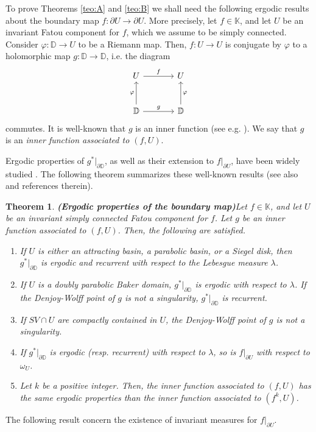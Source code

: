 \documentclass[11pt]{article}
\newtheorem{thm}{Theorem}[section]
\theoremstyle{definition}
\theoremstyle{remark}
\newcounter{main}
\theoremstyle{plain}
\begin{document}
To prove Theorems \ref{teo:A} and \ref{teo:B} we shall need the following ergodic results about the boundary map $ f\colon \partial U\to \partial U $. More precisely, let $ f\in\mathbb{K} $, and let $ U $ be an invariant Fatou component for $ f $, which we assume to be simply connected. Consider $ \varphi\colon\mathbb{D}\to U $ to be a Riemann map. Then,  $ f\colon U\to U $ is conjugate by $ \varphi $ to a holomorphic map $ g\colon\mathbb{D}\to\mathbb{D} $, i.e. the diagram
\[\begin{tikzcd}[row sep=large, column sep=large]
	U \arrow{r}{f} & U \\	
	\mathbb{D} \arrow{r}{g} \arrow{u}{\varphi} & \mathbb{D}\arrow[swap]{u}{\varphi}
\end{tikzcd}
\]
commutes.  
It is well-known that  $ g $ is an inner function (see e.g. \cite[Prop. 5.6]{Jove}).
We say that $ g $ is an {\em inner function associated to $ (f,U) $}. 
 
Ergodic properties of $ g^* |_{\partial\mathbb{D}}$, as well as their extension to $ f|_{\partial U} $,  have been widely studied \cite{Aaronson, DoeringMane1991, bfjk-escaping, Jove}. The following theorem summarizes these well-known results (see also \cite[Thm. 5.7]{Jove} and  references therein).


\begin{thm}{\bf (Ergodic properties of the boundary map)}\label{thm-ergodic-boundary-map}
	Let $ f\in\mathbb{K}$, and let $ U $ be an invariant simply connected Fatou component for $ f $. Let  $ g $ be an inner function associated to $ (f, U) $. Then, the following are satisfied. \begin{enumerate}[label={\em (\roman*)}]
		\item If $ U $ is either an attracting basin, a parabolic basin, or a Siegel disk, then $ g^*|_{\partial\mathbb{D}} $ is ergodic and recurrent with respect to the Lebesgue measure $ \lambda$. 
		\item If $ U $ is a doubly parabolic Baker domain, $ g^*|_{\partial \mathbb{D}} $ is ergodic with respect to $ \lambda$. If the Denjoy-Wolff point of $ g $ is not a singularity, $ g^*|_{\partial \mathbb{D}} $ is recurrent.
		\item If $ SV\cap U $ are compactly contained in $ U$, the Denjoy-Wolff point of $g$ is not a singularity.
		
		\item If $ g^*|_{\partial \mathbb{D}} $ is ergodic (resp. recurrent) with respect to $ \lambda $,  so is $ f|_{{\partial} U} $ with respect to $ \omega_U $. 
		
		
		\item  Let $ k $ be a positive integer. Then, the inner function associated to $ (f,U) $ has the same ergodic properties than the inner function associated to $ (f^k,U) $.
	\end{enumerate}
\end{thm}
The following result concern the existence of invariant measures for $ f|_{\partial U} $.
\end{document}
